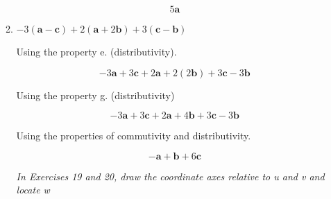 \documentclass{article}
\begin{document}
\begin{enumerate}
\begin{enumerate}
				$$5\boldsymbol{a}$$

			\item $-3(\boldsymbol{a} - \boldsymbol{c}) + 2(\boldsymbol{a} + 2\boldsymbol{b})+3(\boldsymbol{c} - \boldsymbol{b})$

				Using the property e. (distributivity).

				$$-3\boldsymbol{a} + 3\boldsymbol{c} + 2\boldsymbol{a} + 2(2\boldsymbol{b}) + 3\boldsymbol{c} - 3\boldsymbol{b}$$

				Using the property g. (distributivity)

				$$-3\boldsymbol{a} + 3\boldsymbol{c} + 2\boldsymbol{a} + 4\boldsymbol{b} + 3\boldsymbol{c} - 3\boldsymbol{b}$$

				Using the properties of commutivity and distributivity.

				$$-\boldsymbol{a} + \boldsymbol{b} + 6\boldsymbol{c}$$

			\emph{In Exercises 19 and 20, draw the coordinate axes relative to u and v and locate w}

			
		\end{enumerate}



\end{enumerate}
\end{document}
